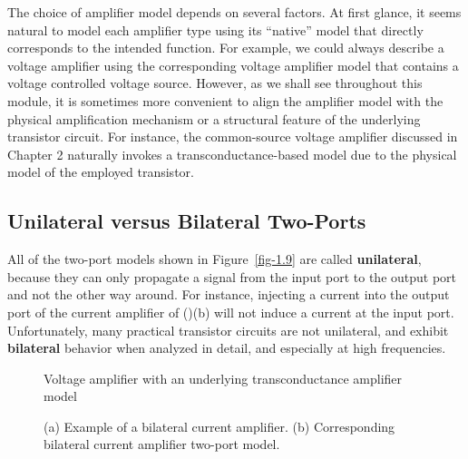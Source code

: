 \documentclass[
  11pt,
  letterpaper,
  abstract]{scrbook}
\begin{document}
The choice of amplifier model depends on several factors. At first
glance, it seems natural to model each amplifier type using its
``native'' model that directly corresponds to the intended function. For
example, we could always describe a voltage amplifier using the
corresponding voltage amplifier model that contains a voltage controlled
voltage source. However, as we shall see throughout this module, it is
sometimes more convenient to align the amplifier model with the physical
amplification mechanism or a structural feature of the underlying
transistor circuit. For instance, the common-source voltage amplifier
discussed in Chapter 2 naturally invokes a transconductance-based model
due to the physical model of the employed transistor.

\subsection{Unilateral versus Bilateral
Two-Ports}\label{unilateral-versus-bilateral-two-ports}

All of the two-port models shown in Figure~\ref{fig-1.9} are called
\textbf{unilateral}, because they can only propagate a signal from the
input port to the output port and not the other way around. For
instance, injecting a current into the output port of the current
amplifier of ()(b) will not
induce a current at the input port. Unfortunately, many practical
transistor circuits are not unilateral, and exhibit \textbf{bilateral}
behavior when analyzed in detail, and especially at high frequencies.

\begin{figure}


\caption{\label{fig-1.11}Voltage amplifier with an underlying
transconductance amplifier model}

\end{figure}%

\begin{figure}


\caption{\label{fig-1.12}(a) Example of a bilateral current amplifier.
(b) Corresponding bilateral current amplifier two-port model.}

\end{figure}%
\end{document}
